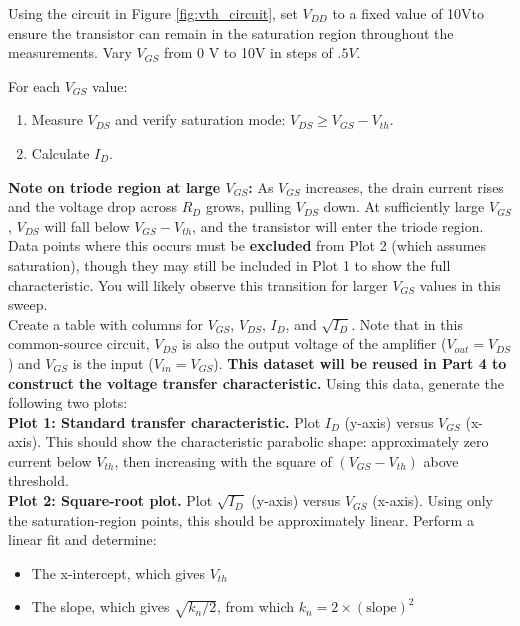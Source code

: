 \documentclass[10pt]{article}
\begin{document}
Using the circuit in Figure \ref{fig:vth_circuit}, set $V_{DD}$ to a fixed value of 10Vto ensure the transistor can remain in the saturation region throughout the measurements. Vary $V_{GS}$ from 0 V to 10V in steps of $.5 V$.%

For each $V_{GS}$ value:

\begin{enumerate}
    \item Measure $V_{DS}$ and verify saturation mode: $V_{DS} \geq V_{GS} - V_{th}$.
    \item Calculate $I_D$.
\end{enumerate}


\textbf{Note on triode region at large $V_{GS}$:} As $V_{GS}$ increases, the drain current rises and the voltage drop across $R_D$ grows, pulling $V_{DS}$ down. At sufficiently large $V_{GS}$, $V_{DS}$ will fall below $V_{GS} - V_{th}$, and the transistor will enter the triode region. Data points where this occurs must be \textbf{excluded} from Plot 2 (which assumes saturation), though they may still be included in Plot 1 to show the full characteristic. You will likely observe this transition for larger $V_{GS}$ values in this sweep.\\

Create a table with columns for $V_{GS}$, $V_{DS}$, $I_D$, and $\sqrt{I_D}$. Note that in this common-source circuit, $V_{DS}$ is also the output voltage of the amplifier ($V_{out} = V_{DS}$) and $V_{GS}$ is the input ($V_{in} = V_{GS}$). \textbf{This dataset will be reused in Part 4 to construct the voltage transfer characteristic.} Using this data, generate the following two plots:\\

\textbf{Plot 1: Standard transfer characteristic. } Plot $I_D$ (y-axis) versus $V_{GS}$ (x-axis). This should show the characteristic parabolic shape:  approximately zero current below $V_{th}$, then increasing with the square of $(V_{GS} - V_{th})$ above threshold. \\

\textbf{Plot 2: Square-root plot.} Plot $\sqrt{I_D}$ (y-axis) versus $V_{GS}$ (x-axis). Using only the saturation-region points, this should be approximately linear. Perform a linear fit and determine:
\begin{itemize}
    \item The x-intercept, which gives $V_{th}$
    \item The slope, which gives $\sqrt{k_n/2}$, from which $k_n = 2 \times (\text{slope})^2$
\end{itemize}
\end{document}
